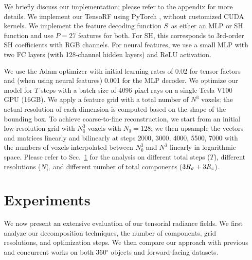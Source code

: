 \documentclass[runningheads]{llncs}
\begin{document}
\label{sec:impl}
We briefly discuss our implementation; please refer to the appendix for more details.
We implement our TensoRF using PyTorch \cite{pytorch}, without customized CUDA kernels.
We implement the feature decoding function $S$ as either an MLP or SH function and use $P=27$ features for both. For SH, this corresponds to 3rd-order SH coefficients with RGB channels. For neural features, we use a small MLP with two FC layers (with 128-channel hidden layers) and ReLU activation.

We use the Adam optimizer \cite{adam} with initial learning rates of 0.02 for tensor factors and (when using neural features) 0.001 for the MLP decoder.
We optimize our model for $T$ steps with a batch size of 4096 pixel rays on a single Tesla V100 GPU (16GB).
We apply a feature grid with a total number of $N^3$ voxels; the actual resolution of each dimension is computed based on the shape of the bounding box. 
To achieve coarse-to-fine reconstruction, we start from an initial low-resolution grid with $N_0^3$ voxels with $N_0=128$; we then
 upsample the vectors and matrices linearly and bilinearly at steps 2000, 3000, 4000, 5500, 7000 with the numbers of voxels interpolated between $N_0^3$ and $N^3$ linearly in logarithmic space. 
 Please refer to Sec.~\ref{sec:exp} for the analysis on different total steps ($T$), different resolutions ($N$), and different number of total components ($3R_\sigma+3R_c$).
 





































\section{Experiments}
\label{sec:exp}
We now present an extensive evaluation of our tensorial radiance fields. We first analyze our decomposition techniques, the number of components, grid resolutions, and optimization steps. We then compare our approach with previous and concurrent works on both 360$^\circ$ objects and forward-facing datasets.
\end{document}
